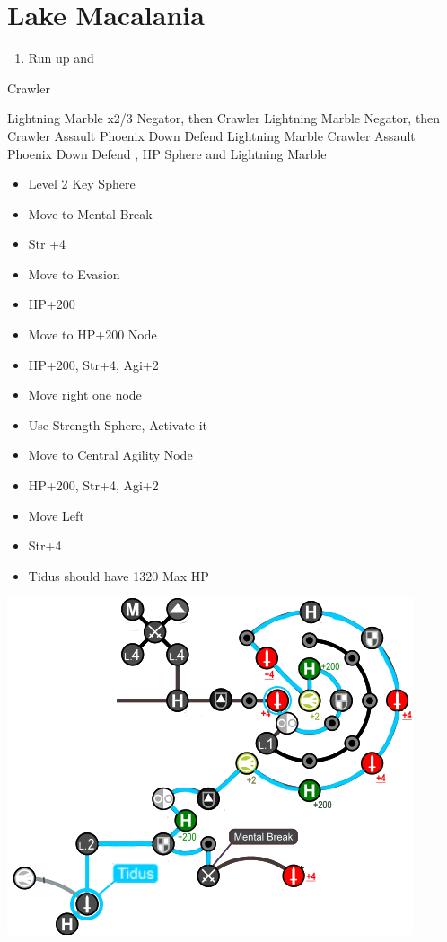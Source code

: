 \chapter{Lake Macalania}

\begin{enumerate}
  \item Run up and \sd
\end{enumerate}
\begin{battle}[1600]{Crawler}
  \begin{itemize}
    \switch{\tidus}{\rikku}
    \rikkuf Lightning Marble x2/3 Negator, then Crawler
    \kimahrif Lightning Marble Negator, then Crawler
    \enemyf Assault \rikku
    \luluf Phoenix Down \rikku
    \switch{\kimahri}{\yuna}
    \yunaf Defend
    \rikkuf Lightning Marble Crawler
    \enemyf Assault \rikku
    \luluf Phoenix Down \rikku
    \switch{\yuna}{\tidus}
    \tidusf Defend
    \rikkuf \od, HP Sphere and Lightning Marble
  \end{itemize}
\end{battle}
\begin{spheregrid}
  \begin{itemize}
    \tidusf
    \begin{itemize}
      \item Level 2 Key Sphere
      \item Move to Mental Break
      \item Str +4
      \item Move to Evasion
      \item HP+200
      \item Move to HP+200 Node
      \item HP+200, Str+4, Agi+2
      \item Move right one node
      \item Use Strength Sphere, Activate it
      \item Move to Central Agility Node
      \item HP+200, Str+4, Agi+2
      \item Move Left
      \item Str+4
      \item Tidus should have 1320 Max HP
    \end{itemize}
    \includegraphics[width=.8\columnwidth]{graphics/Tidus_post_crawler}
  \end{itemize}
\end{spheregrid}
